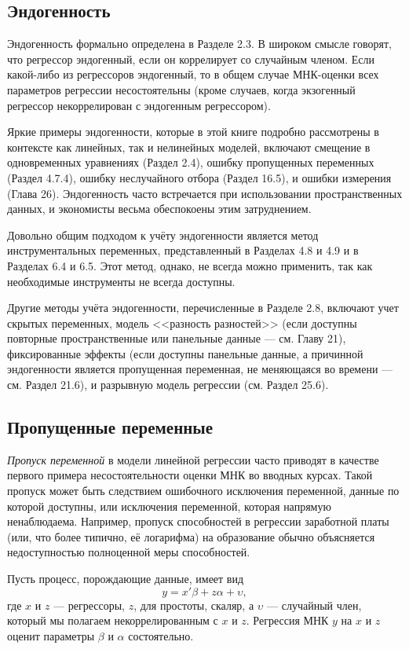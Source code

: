 \subsection{Эндогенность}
Эндогенность формально определена в Разделе 2.3. В широком смысле говорят, что регрессор эндогенный, если он коррелирует со случайным членом. Если какой-либо из регрессоров эндогенный, то в общем случае МНК-оценки всех параметров регрессии несостоятельны (кроме случаев, когда экзогенный регрессор некоррелирован с эндогенным регрессором). 

Яркие примеры эндогенности, которые в этой книге подробно рассмотрены в контексте как линейных, так и нелинейных моделей, включают смещение в одновременных уравнениях (Раздел 2.4), ошибку пропущенных переменных (Раздел 4.7.4), ошибку неслучайного отбора (Раздел 16.5), и ошибки измерения (Глава 26). Эндогенность часто встречается при использовании пространственных данных, и экономисты весьма обеспокоены этим затруднением.

Довольно общим подходом к учёту эндогенности является метод инструментальных переменных, представленный в Разделах 4.8 и 4.9 и в Разделах 6.4 и 6.5.  Этот метод, однако, не всегда можно применить, так как необходимые инструменты не всегда доступны.

Другие методы учёта эндогенности, перечисленные в Разделе 2.8, включают учет скрытых переменных, модель <<разность разностей>> (если доступны повторные пространственные или панельные данные --- см. Главу 21), фиксированные эффекты (если доступны панельные данные, а причинной эндогенности является пропущенная переменная, не меняющаяся во времени --- см. Раздел 21.6), и разрывную модель регрессии (см. Раздел 25.6).

\subsection{Пропущенные переменные}
\textit{Пропуск переменной} в модели линейной регрессии часто приводят в качестве первого примера несостоятельности оценки МНК во вводных курсах. Такой пропуск может быть следствием ошибочного исключения переменной, данные по которой доступны, или исключения переменной, которая напрямую ненаблюдаема. Например, пропуск способностей в регрессии заработной платы (или, что более типично, её логарифма) на образование обычно объясняется недоступностью полноценной меры способностей.

Пусть процесс, порождающие данные, имеет вид
\begin{equation}
y = x'\beta + z\alpha + \upsilon,
\end{equation}
где $x$ и $z$ --- регрессоры, $z$, для простоты, скаляр, а $\upsilon$ --- случайный член, который мы полагаем некоррелированным с $x$ и $z$. Регрессия МНК $y$ на $x$ и $z$ оценит параметры $\beta$ и $\alpha$ состоятельно. 


